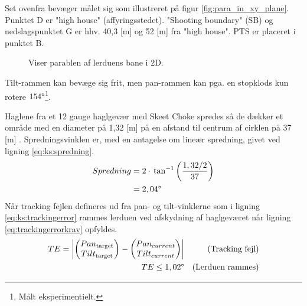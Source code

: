 Set ovenfra bevæger målet sig som illustreret på figur \ref{fig:para_in_xy_plane}.
Punktet D er "high house" (affyringsstedet).
"Shooting boundary" (SB) og nedslagspunktet G er hhv. 40,3 [m] og 52 [m] fra "high house". PTS er placeret i punktet B.\\
\begin{figure}[h!]
\centering
{}
\caption[Lerduens parabel i 2D]{Viser parablen af lerduens bane i 2D.}
\end{figure}

Tilt-rammen kan bevæge sig frit,
men pan-rammen kan pga. en stopklods kun rotere \(154 \degree\)\footnote{Målt eksperimentielt.}.

Haglene fra et 12 gauge haglgevær med Skeet Choke spredes så de dækker et område
med en diameter på 1,32 [m] på en afstand til centrum af cirklen på 37 [m] \citep[Pattern and choke]{patternandchoke}.
Spredningsvinklen er, med en antagelse om lineær spredning, givet ved ligning \ref{eq:ks:spredning}.
\begin{align}
\begin{split}
  Spredning &= 2\cdot{}\tan^{-1}\left(\frac{1,32/2}{37}\right) \\
  &= 2,04 \degree
  \end{split}
  \label{eq:ks:spredning}
\end{align}
Når tracking fejlen defineres ud fra pan- og tilt-vinklerne som i ligning \ref{eq:ks:trackingerror} rammes 
lerduen ved afskydning af haglgeværet når ligning \ref{eq:trackingerrorkrav} opfyldes.
\begin{align}
  TE = \left | \begin{pmatrix}  Pan_{\text{target}}\\ Tilt_{\text{target}}\end{pmatrix} - \begin{pmatrix} Pan_{current}\\ 
  Tilt_{current}\end{pmatrix} \right | &&\text{(Tracking fejl)}
\label{eq:ks:trackingerror}
\\
	TE\leq 1,02 \degree && \text{(Lerduen rammes)}
\label{eq:trackingerrorkrav}
\end{align}

